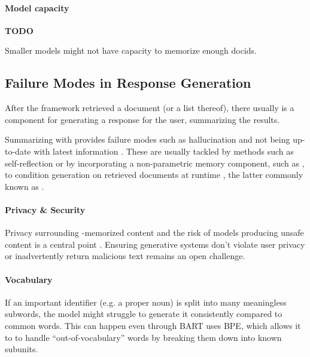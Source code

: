 \paragraph{Model capacity}
\label{sec:model-capacity}

\textbf{TODO}

Smaller models might not have capacity to memorize enough docids.


\subsection{Failure Modes in Response Generation}
\label{subsec:failure-respgen}

After the  framework retrieved a document (or a list thereof), there usually is a component for generating a response for the user, summarizing the results.

Summarizing with  provides failure modes such as hallucination \cite{huang-a-survey} and not being up-to-date with latest information \cite{vu-freshllms-refreshing}. These are usually tackled by methods such as self-reflection \cite{jason-wei-chainofthought-prompting,akari-asai-selfrag-learning} or by incorporating a non-parametric memory component, such as , to condition generation on retrieved documents at runtime \cite{patrick-lewis-retrievalaugmented-generation}, the latter commonly known as .


\paragraph{Privacy \& Security}

Privacy surrounding -memorized content and the risk of models producing unsafe content is a central point \cite{xiaoxi-li-from-matching}. Ensuring generative systems don't violate user privacy or inadvertently return malicious text remains an open challenge.


\paragraph{Vocabulary}
\label{sec:vocab}


If an important identifier (e.g. a proper noun) is split into many meaningless subwords, the model might struggle to generate it consistently compared to common words. This can happen even through BART uses BPE, which allows it to to handle ``out-of-vocabulary'' words by breaking them down into known subunits.

